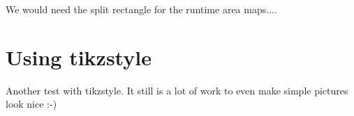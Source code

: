 We would need the split rectangle for the runtime area maps....


\section{Using tikzstyle}

Another test with tikzstyle. It still is a lot of work to even make simple pictures look nice :-)

